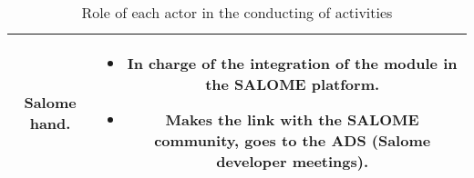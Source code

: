 \begin{table}[h!]
\begin{tabular}{cc}
\midrule
Salome hand. &
\begin{minipage}[l]{12cm}
\begin{itemize}
\itemsep-5pt
\item In charge of the integration of the \telemacsystem{} module in the SALOME
  platform.
\item Makes the link with the SALOME community, goes to the ADS (Salome
  developer meetings).
\end{itemize}
\end{minipage}\\
\bottomrule
\end{tabular}
\caption{\label{rea} Role of each actor in the conducting of \telemacsystem{} activities}
\end{table}
